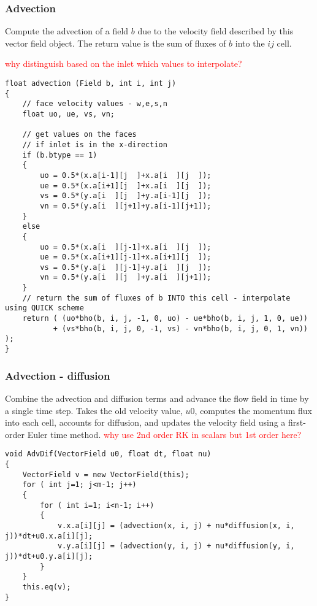 \documentclass[notitlepage]{article}
\begin{document}
\subsubsection{Advection}

Compute the advection of a field $b$ due to the velocity field described by
this vector field object.
The return value is the sum of fluxes of $b$ into the $ij$ cell.

\textcolor{red}{why distinguish based on the inlet which values to interpolate?}

\begin{lstlisting}[style=myCpp]
float advection (Field b, int i, int j)
{
	// face velocity values - w,e,s,n
	float uo, ue, vs, vn;
	
	// get values on the faces
	// if inlet is in the x-direction
	if (b.btype == 1)
	{
		uo = 0.5*(x.a[i-1][j  ]+x.a[i  ][j  ]);
		ue = 0.5*(x.a[i+1][j  ]+x.a[i  ][j  ]);
		vs = 0.5*(y.a[i  ][j  ]+y.a[i-1][j  ]);
		vn = 0.5*(y.a[i  ][j+1]+y.a[i-1][j+1]);
	}
	else
	{
		uo = 0.5*(x.a[i  ][j-1]+x.a[i  ][j  ]);
		ue = 0.5*(x.a[i+1][j-1]+x.a[i+1][j  ]);
		vs = 0.5*(y.a[i  ][j-1]+y.a[i  ][j  ]);
		vn = 0.5*(y.a[i  ][j  ]+y.a[i  ][j+1]);
	}
	// return the sum of fluxes of b INTO this cell - interpolate using QUICK scheme
	return ( (uo*bho(b, i, j, -1, 0, uo) - ue*bho(b, i, j, 1, 0, ue))
		   + (vs*bho(b, i, j, 0, -1, vs) - vn*bho(b, i, j, 0, 1, vn)) );
}
\end{lstlisting}

\subsubsection{Advection - diffusion}

Combine the advection and diffusion terms and advance the flow field in time by
a single time step.
Takes the old velocity value, $u0$, computes the momentum flux into each cell,
accounts for diffusion, and updates the velocity field using a first-order
Euler time method.
\textcolor{red}{why use 2nd order RK in scalars but 1st order here?}

\begin{lstlisting}[style=myCpp]
void AdvDif(VectorField u0, float dt, float nu)
{
	VectorField v = new VectorField(this);
	for ( int j=1; j<m-1; j++)
	{
		for ( int i=1; i<n-1; i++)
		{
			v.x.a[i][j] = (advection(x, i, j) + nu*diffusion(x, i, j))*dt+u0.x.a[i][j];
			v.y.a[i][j] = (advection(y, i, j) + nu*diffusion(y, i, j))*dt+u0.y.a[i][j];
		}
	}
	this.eq(v);   
}
\end{lstlisting}
\end{document}
